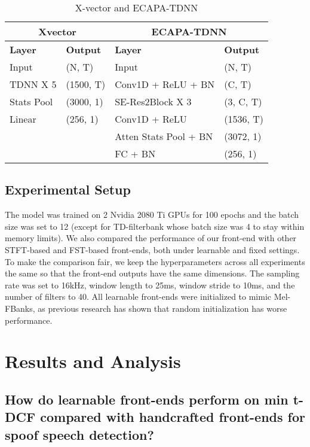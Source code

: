 \documentclass[conference]{IEEEtran}
\begin{document}
\begin{table}[bhtp]
    \caption{\label{table:backend} X-vector and ECAPA-TDNN}
\centering
\begin{tabular}{ll|ll}
\hline 
\multicolumn{2}{c|}{\textbf{Xvector}} & \multicolumn{2}{c}{\textbf{ECAPA-TDNN}} \\
\hline 
\textbf{Layer} & \textbf{Output} &  \textbf{Layer} & \textbf{Output} 
\\\hline 
Input & (N, T) & Input & (N, T) 
\\\hline 
TDNN X 5  & (1500, T) & Conv1D + ReLU + BN & (C, T)
\\\hline 
Stats Pool  & (3000, 1) & SE-Res2Block X 3 & (3, C, T)
\\\hline 
Linear &  (256, 1) & Conv1D + ReLU & (1536, T)
\\\hline 
& & Atten Stats Pool + BN & (3072, 1)
\\\hline 
& &  FC + BN & (256, 1)
\\\hline 
\end{tabular}
\end{table}



\subsection{Experimental Setup}
The model was trained on 2 Nvidia 2080 Ti GPUs for 100 epochs and the batch size was set to 12 (except for TD-filterbank whose batch size was 4 to stay within memory limits). We also compared the performance of our front-end with other STFT-based and FST-based front-ends, both under learnable and fixed settings. To make the comparison fair, we keep the hyperparameters across all experiments the same so that the front-end outputs have the same dimensions. The sampling rate was set to 16kHz, window length to 25ms, window stride to 10ms, and the number of filters to 40. All learnable front-ends were initialized to mimic Mel-FBanks, as previous research\cite{Zeghidour2018LearningFF} has shown that random initialization has worse performance. 




\section{Results and Analysis}
\label{results.section}

\subsection{\textbf{How do learnable front-ends perform on min t-DCF compared with handcrafted front-ends for spoof speech detection?}}
\end{document}
